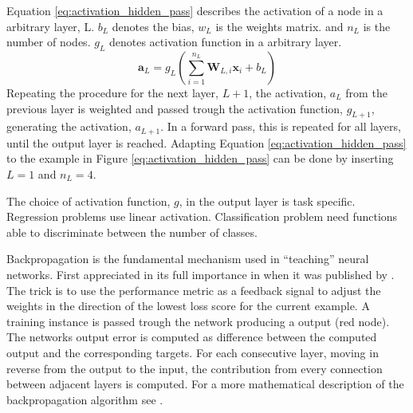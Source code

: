 Equation \eqref{eq:activation_hidden_pass} describes the activation of a node in a arbitrary layer, L. $b_L$ denotes the bias, $w_L$ is the weights matrix. and $n_L$ is the number of  nodes. $g_L$ denotes activation function in a arbitrary layer.
\begin{equation} \label{eq:activation_hidden_pass}
    \textbf{a}_L = g_L\left(\sum_{i=1}^{n_L} \textbf{W}_{L, i} \textbf{x}_i + b_L\right)
\end{equation}
Repeating the procedure for the next layer, $L+1$, the activation, $a_L$ from the previous layer is weighted and passed trough the activation function, $g_{L+1}$, generating the activation, $a_{L+1}$. In a forward pass, this is repeated for all layers, until the output layer is reached. Adapting Equation \eqref{eq:activation_hidden_pass} to the example in Figure \ref{eq:activation_hidden_pass} can be done by inserting $L=1$ and $n_L=4$.

The choice of activation function, $g$, in the output layer is task specific. Regression problems use linear activation. Classification problem need functions able to discriminate between the number of classes.

Backpropagation is the fundamental mechanism used in ``teaching'' neural networks. First appreciated in its full importance in \citeyear{RumelhartBackProp} when it was published by \citeauthor{RumelhartBackProp}. The trick is to use the performance metric as a feedback signal to adjust the weights in the direction of the lowest loss score for the current example. A training instance is passed trough the network producing a output (red node). The networks output error is computed as difference between the computed output and the corresponding targets. For each consecutive layer, moving in reverse from the output to the input, the contribution from every connection between adjacent layers is computed.
For a more mathematical description of the backpropagation algorithm see \cite{nielsen_back_prop}.

